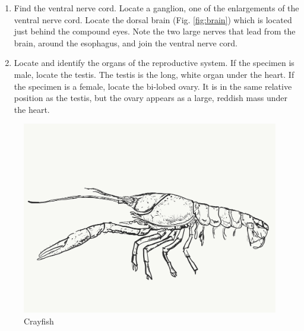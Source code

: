 \begin{enumerate}
\item
  Find the ventral nerve cord. Locate a ganglion, one of the enlargements of the ventral nerve cord. Locate the dorsal brain (Fig. \ref{fig:brain}) which is located just behind the compound eyes. Note the two large nerves that lead from the brain, around the esophagus, and join the ventral nerve cord.
\item
  Locate and identify the organs of the reproductive system. If the specimen is male, locate the testis. The testis is the long, white organ under the heart. If the specimen is a female, locate the bi-lobed ovary. It is in the same relative position as the testis, but the ovary appears as a large, reddish mass under the heart.
\end{enumerate}

\begin{figure}

{\centering \includegraphics[width=0.7\linewidth]{./figures/nematoda/crayfish}

}

\caption{Crayfish}\label{fig:crayfish}
\end{figure}

